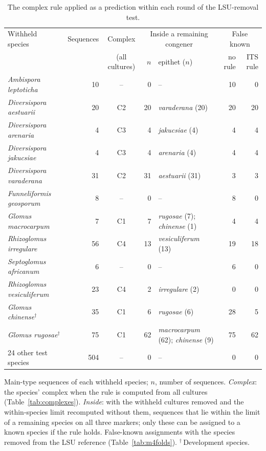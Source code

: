 \begin{table}[htbp]\centering
\begin{threeparttable}
\caption{The complex rule applied as a prediction within each round of the LSU-removal test.}
\label{tab:foldwise}
\footnotesize\setlength{\tabcolsep}{2pt}
\begin{tabular}{lrcrlrr}
\toprule
Withheld species & Sequences & Complex & \multicolumn{2}{c}{Inside a remaining congener} & \multicolumn{2}{c}{False known}\\
 & & (all cultures) & $n$ & epithet ($n$) & no rule & ITS rule\\
\midrule
\emph{Ambispora leptoticha} & 10 & -- & 0 & -- & 10 & 0\\
\emph{Diversispora aestuarii} & 20 & C2 & 20 & \emph{varaderana} (20) & 20 & 20\\
\emph{Diversispora arenaria} & 4 & C3 & 4 & \emph{jakucsiae} (4) & 4 & 4\\
\emph{Diversispora jakucsiae} & 4 & C3 & 4 & \emph{arenaria} (4) & 4 & 4\\
\emph{Diversispora varaderana} & 31 & C2 & 31 & \emph{aestuarii} (31) & 3 & 3\\
\emph{Funneliformis geosporum} & 8 & -- & 0 & -- & 8 & 0\\
\emph{Glomus macrocarpum} & 7 & C1 & 7 & \emph{rugosae} (7); \emph{chinense} (1) & 4 & 4\\
\emph{Rhizoglomus irregulare} & 56 & C4 & 13 & \emph{vesiculiferum} (13) & 19 & 18\\
\emph{Septoglomus africanum} & 6 & -- & 0 & -- & 6 & 0\\
\emph{Rhizoglomus vesiculiferum} & 23 & C4 & 2 & \emph{irregulare} (2) & 0 & 0\\
\emph{Glomus chinense}$^{\dagger}$ & 35 & C1 & 6 & \emph{rugosae} (6) & 28 & 5\\
\emph{Glomus rugosae}$^{\dagger}$ & 75 & C1 & 62 & \emph{macrocarpum} (62); \emph{chinense} (9) & 75 & 62\\
24 other test species & 504 & -- & 0 & -- & 0 & 0\\
\bottomrule
\end{tabular}
\begin{tablenotes}\footnotesize
\item Main-type sequences of each withheld species; $n$, number of sequences. \emph{Complex}: the species' complex when the rule is computed from all
cultures (Table~\ref{tab:complexes}). \emph{Inside}: with the withheld cultures removed and the within-species limit
recomputed without them, sequences that lie within the limit of a remaining species on all three markers; only these
can be assigned to a known species if the rule holds. False-known assignments with the species removed from the LSU reference
(Table~\ref{tab:m4folds}). $^{\dagger}$\,Development species.
\end{tablenotes}
\end{threeparttable}
\end{table}
